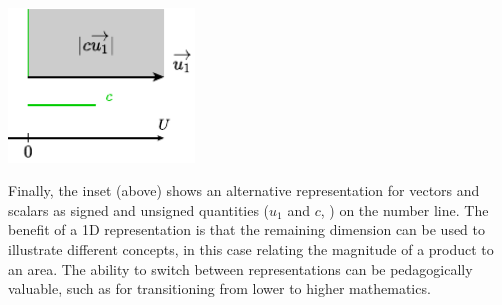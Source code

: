 \begin{center}
\includegraphics[width=140pt]{assets/penrose/LinearAlgebra1D.pdf}
\end{center}

Finally, the inset (above) shows an alternative representation for vectors and scalars as signed and unsigned quantities ($u_1$ and $c$, \resp{}) on the number line.  The benefit of a 1D representation is that the remaining dimension can be used to illustrate different concepts, in this case relating the magnitude of a product to an area.  The ability to switch between representations can be pedagogically valuable, such as for transitioning from lower to higher mathematics.

